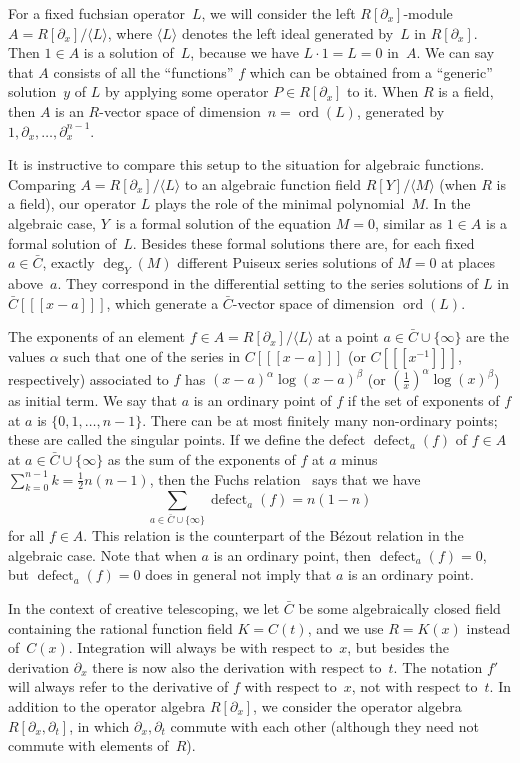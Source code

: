 \documentclass[final,1p,times,authoryear]{elsarticle}
\def\ord{\operatorname{ord}}
\def\<#1>{\langle#1\rangle}
\def\defect{\operatorname{defect}}
\begin{document}
For a fixed fuchsian operator~$L$, we will consider the left $R[\partial_x]$-module
$A=R[\partial_x]/\<L>$, where $\<L>$ denotes the left ideal generated by~$L$ in
$R[\partial_x]$.  Then $1\in A$ is a solution of~$L$, because we have $L\cdot 1=L=0$
in~$A$. We can say that $A$ consists of all the ``functions'' $f$ which can be
obtained from a ``generic'' solution~$y$ of $L$ by applying some operator $P\in
R[\partial_x]$ to it. When $R$ is a field, then $A$ is an $R$-vector space of
dimension~$n=\ord(L)$, generated by $1,\partial_x,\dots,\partial_x^{n-1}$.

It is instructive to compare this setup to the situation for algebraic
functions. Comparing $A=R[\partial_x]/\<L>$ to an algebraic function field $R[Y]/\<M>$
(when $R$ is a field), our operator $L$ plays the role of the minimal
polynomial~$M$. In the algebraic case, $Y$~is a formal solution of the equation
$M=0$, similar as $1\in A$ is a formal solution of~$L$. Besides these formal
solutions there are, for each fixed $a\in\bar C$, exactly $\deg_Y(M)$ different
Puiseux series solutions of $M=0$ at places above~$a$. They correspond in the
differential setting to the series solutions of $L$ in $\bar C[[[x-a]]]$, which
generate a $\bar C$-vector space of dimension $\ord(L)$.

The exponents of an element $f\in A=R[\partial_x]/\<L>$ at a point $a\in\bar C\cup\{\infty\}$
are the values $\alpha$ such that one of the series in $C[[[x-a]]]$ (or $C[[[x^{-1}]]]$, respectively)
associated to $f$ has $(x-a)^\alpha\log(x-a)^\beta$ (or $(\frac1x)^\alpha\log(x)^\beta$) as initial
term. We say that $a$ is an ordinary point of $f$ if the set of exponents of $f$ at $a$ is $\{0,1,\dots,n-1\}$.
There can be at most finitely many non-ordinary points; these are called the singular points. If we define
the defect $\defect_a(f)$ of $f\in A$ at $a\in\bar C\cup\{\infty\}$ as the sum of the exponents of $f$ at $a$ minus
$\sum_{k=0}^{n-1}k=\frac12n(n-1)$, then the Fuchs relation~\citep{schlesinger95,ince26} says that we have
\[
 \sum_{a\in\bar C\cup\{\infty\}} \defect_a(f) = n(1-n)
\]
for all $f\in A$. This relation is the counterpart of the B\'{e}zout relation in the algebraic case.
Note that when $a$ is an ordinary point, then $\defect_a(f)=0$, but $\defect_a(f)=0$ does in
general not imply that $a$ is an ordinary point.

In the context of creative telescoping, we let $\bar C$ be some algebraically
closed field containing the rational function field $K=C(t)$, and we
use $R=K(x)$ instead of~$C(x)$. Integration will always be with respect to~$x$, but
besides the derivation $\partial_x$ there is now also the derivation with respect
to~$t$. The notation $f'$ will always refer to the derivative of $f$
with respect to~$x$, not with respect to~$t$. In addition to the operator
algebra $R[\partial_x]$, we consider the
operator algebra $R[\partial_x,\partial_t]$, in which $\partial_x,\partial_t$
commute with each other (although they need not commute with elements of~$R$).
\end{document}

